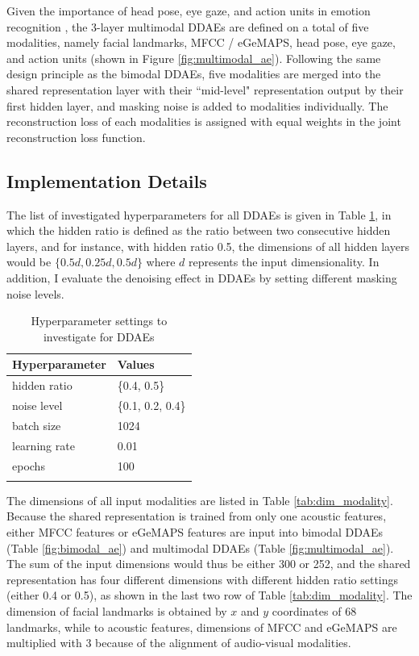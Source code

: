 Given the importance of head pose, eye gaze, and action units in emotion recognition \cite{adams2015, ekman2013}, the 3-layer multimodal DDAEs are defined on a total of five modalities, namely facial landmarks, MFCC / eGeMAPS, head pose, eye gaze, and action units (shown in Figure \ref{fig:multimodal_ae}). Following the same design principle as the bimodal DDAEs, five modalities are merged into the shared representation layer with their ``mid-level" representation output by their first hidden layer, and masking noise is added to modalities individually. The reconstruction loss of each modalities is assigned with equal weights in the joint reconstruction loss function. 

\subsection{Implementation Details}

The list of investigated hyperparameters for all DDAEs is given in Table \ref{tab:param_DDAE}, in which the hidden ratio is defined as the ratio between two consecutive hidden layers, and for instance, with hidden ratio 0.5, the dimensions of all hidden layers would be $\{0.5d, 0.25d, 0.5d\}$ where $d$ represents the input dimensionality. In addition, I evaluate the denoising effect in DDAEs by setting different masking noise levels.


\begin{table}[ht]
    \centering
    \caption{Hyperparameter settings to investigate for DDAEs}
    \begin{tabular}{l|l}
        \Xhline{2\arrayrulewidth}
        Hyperparameter & Values \\
        \hline
        hidden ratio & \{0.4, 0.5\} \\
        noise level & \{0.1, 0.2, 0.4\} \\
        batch size & 1024 \\
        learning rate & 0.01 \\
        epochs & 100 \\
        \Xhline{2\arrayrulewidth}
    \end{tabular}
    \label{tab:param_DDAE}
\end{table}

The dimensions of all input modalities are listed in Table \ref{tab:dim_modality}. Because the shared representation is trained from only one acoustic features, either MFCC features or eGeMAPS features are input into bimodal DDAEs (Table \ref{fig:bimodal_ae}) and multimodal DDAEs (Table \ref{fig:multimodal_ae}). The sum of the input dimensions would thus be either 300 or 252, and the shared representation has four different dimensions with different hidden ratio settings (either 0.4 or 0.5), as shown in the last two row of Table \ref{tab:dim_modality}. The dimension of facial landmarks is obtained by $x$ and $y$ coordinates of 68 landmarks, while to acoustic features, dimensions of MFCC and eGeMAPS are multiplied with 3 because of the alignment of audio-visual modalities.

